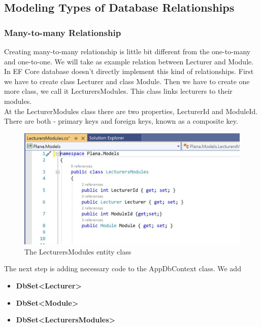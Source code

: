\documentclass{scrartcl}
\begin{document}
\subsection{Modeling Types of Database Relationships}
\subsubsection{Many-to-many Relationship }
Creating many-to-many relationship is little bit different from the one-to-many and one-to-one.
We will take as example relation between Lecturer and Module.\\

In EF Core database doesn't directly implement this kind of relationships.
First we have to create class Lecturer and class Module. Then we have to create one more class, we call it LecturersModules. This class links lecturers to their modules. \\
At the LecturerModules class there are two properties, LecturerId and ModuleId. There are both - primary keys and foreign keys, known as a composite key.\cite{efa}


\begin{figure}[H]
\centering
\includegraphics[width=150mm]{report_img/lecturers-modules.JPG}
\caption{The LecturersModules entity class}
\label{blabla}
\end{figure}

 The next step  is adding necessary code to the AppDbContext class. We add 
 \begin{itemize}
 \item \textbf{DbSet<Lecturer>} 
 \item \textbf {DbSet<Module>}
 \item \textbf{DbSet<LecturersModules>}
 \end{itemize}
 
 
 
\end{document}
